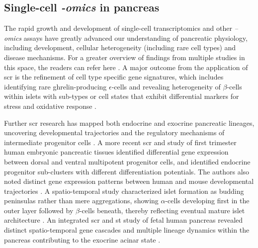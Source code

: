 \subsection{Single-cell \textit{-omics} in pancreas}
\label{sec:single-cell_pancreas}
\par The rapid growth and development of single-cell transcriptomics and other \textit{–omics} assays have greatly advanced our understanding of pancreatic physiology, including development, cellular heterogeneity (including rare cell types) and disease mechanisms. For a greater overview of findings from multiple studies in this space, the readers can refer here \textbf{\cite{wang_single-cell_2019,avrahami_beta_2017,carrano_interrogating_2017}}. A major outcome from the application of \gls{scr} is the refinement of cell type specific gene signatures, which includes identifying rare ghrelin-producing $\epsilon$-cells and revealing heterogeneity of $\beta$-cells within islets with sub-types or cell states that exhibit differential markers for  stress and oxidative response \textbf{\cite{segerstolpe_single-cell_2016,muraro_single-cell_2016}}.\\
\par Further \gls{scr} research has mapped both endocrine and exocrine pancreatic lineages, uncovering developmental trajectories and the regulatory mechanisms of intermediate progenitor cells \textbf{\cite{yu_defining_2019}}. A more recent \gls{scr} and  study of first trimester human embryonic pancreatic tissues identified differential gene expression between dorsal and ventral multipotent progenitor cells, and identified endocrine progenitor sub-clusters with different differentiation potentials. The authors also noted distinct gene expression patterns between human and mouse developmental trajectories \textbf{\cite{ma_deciphering_2023}}. A spatio-temporal study characterized islet formation as budding peninsulas rather than mere aggregations, showing $\alpha$-cells developing first in the outer layer followed by $\beta$-cells beneath, thereby reflecting eventual mature islet architecture \textbf{\cite{sharon_peninsular_2019}}. An integrated \gls{scr} and \gls{st} study of fetal human pancreas revealed distinct spatio-temporal gene cascades and multiple lineage dynamics within the pancreas contributing to the exocrine acinar state \textbf{\cite{olaniru_single-cell_2023}}.\\

